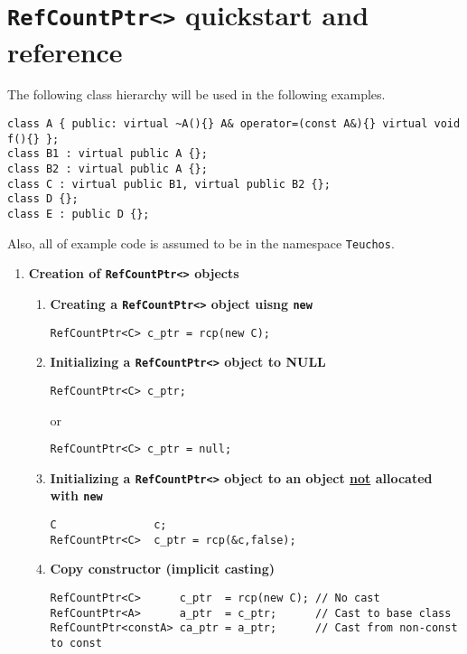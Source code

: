 %
\section{\texttt{RefCountPtr<>} quickstart and reference}
\label{rcp:apdx:quickstart}
%

The following class hierarchy will be used in the following
examples.
%
{\small\begin{verbatim}
class A { public: virtual ~A(){} A& operator=(const A&){} virtual void f(){} };
class B1 : virtual public A {};
class B2 : virtual public A {};
class C : virtual public B1, virtual public B2 {};
class D {};
class E : public D {};
\end{verbatim}}
%
Also, all of example code is assumed to be in the namespace
\texttt{Teuchos}.

\begin{enumerate}

\item {\bf Creation of \texttt{RefCountPtr<>} objects}

\begin{enumerate}

\item {\bf Creating a \texttt{RefCountPtr<>} object uisng \texttt{new}}
%
{\small\begin{verbatim}
RefCountPtr<C> c_ptr = rcp(new C);
\end{verbatim}}
%
\item {\bf Initializing a \texttt{RefCountPtr<>} object to NULL}
%
{\small\begin{verbatim}
RefCountPtr<C> c_ptr;
\end{verbatim}}
or
{\small\begin{verbatim}
RefCountPtr<C> c_ptr = null;
\end{verbatim}}
%
\item {\bf Initializing a \texttt{RefCountPtr<>} object to an object
       \underline{not} allocated with \texttt{new}}
%
{\small\begin{verbatim}
C               c;
RefCountPtr<C>  c_ptr = rcp(&c,false);
\end{verbatim}}
%
\item {\bf Copy constructor (implicit casting)}
%
{\small\begin{verbatim}
RefCountPtr<C>      c_ptr  = rcp(new C); // No cast
RefCountPtr<A>      a_ptr  = c_ptr;      // Cast to base class
RefCountPtr<constA> ca_ptr = a_ptr;      // Cast from non-const to const
\end{verbatim}}
%
\end{enumerate}


\end{enumerate}

